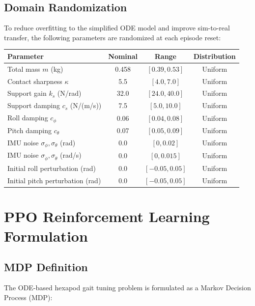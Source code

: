 \documentclass[11pt]{article}
\begin{document}
\subsection{Domain Randomization}

To reduce overfitting to the simplified ODE model and improve sim-to-real transfer, the following parameters are randomized at each episode reset:

\begin{center}
\begin{tabular}{lccc}
\toprule
\textbf{Parameter} & \textbf{Nominal} & \textbf{Range} & \textbf{Distribution} \\
\midrule
Total mass $m$ (kg) & 0.458 & $[0.39, 0.53]$ & Uniform \\
Contact sharpness $\kappa$ & 5.5 & $[4.0, 7.0]$ & Uniform \\
Support gain $k_s$ (N/rad) & 32.0 & $[24.0, 40.0]$ & Uniform \\
Support damping $c_s$ (N/(m/s)) & 7.5 & $[5.0, 10.0]$ & Uniform \\
Roll damping $c_\phi$ & 0.06 & $[0.04, 0.08]$ & Uniform \\
Pitch damping $c_\theta$ & 0.07 & $[0.05, 0.09]$ & Uniform \\
IMU noise $\sigma_\phi, \sigma_\theta$ (rad) & 0.0 & $[0, 0.02]$ & Uniform \\
IMU noise $\sigma_{\dot\phi}, \sigma_{\dot\theta}$ (rad/s) & 0.0 & $[0, 0.015]$ & Uniform \\
Initial roll perturbation (rad) & 0.0 & $[-0.05, 0.05]$ & Uniform \\
Initial pitch perturbation (rad) & 0.0 & $[-0.05, 0.05]$ & Uniform \\
\bottomrule
\end{tabular}
\end{center}

\section{PPO Reinforcement Learning Formulation}
\label{sec:ppo}

\subsection{MDP Definition}

The ODE-based hexapod gait tuning problem is formulated as a Markov Decision Process (MDP):
\end{document}
